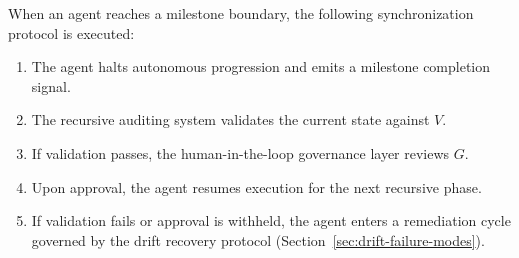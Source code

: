 When an agent reaches a milestone boundary, the following synchronization protocol
is executed:

\begin{enumerate}
  \item The agent halts autonomous progression and emits a milestone completion signal.
  \item The recursive auditing system validates the current state against $V$.
  \item If validation passes, the human-in-the-loop governance layer reviews $G$.
  \item Upon approval, the agent resumes execution for the next recursive phase.
  \item If validation fails or approval is withheld, the agent enters a remediation
    cycle governed by the drift recovery protocol (Section~\ref{sec:drift-failure-modes}).
\end{enumerate}
